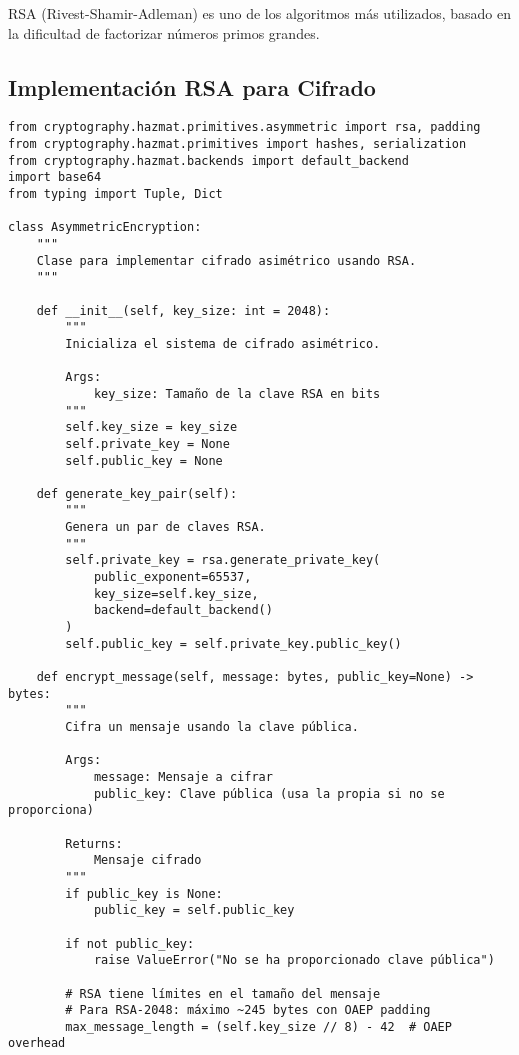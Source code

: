 \documentclass[12pt,a4paper]{article}
\begin{document}
RSA (Rivest-Shamir-Adleman) es uno de los algoritmos más utilizados, basado en la dificultad de factorizar números primos grandes.

\subsection{Implementación RSA para Cifrado}

\begin{lstlisting}[caption=Implementación de cifrado asimétrico con RSA]
from cryptography.hazmat.primitives.asymmetric import rsa, padding
from cryptography.hazmat.primitives import hashes, serialization
from cryptography.hazmat.backends import default_backend
import base64
from typing import Tuple, Dict

class AsymmetricEncryption:
    """
    Clase para implementar cifrado asimétrico usando RSA.
    """
    
    def __init__(self, key_size: int = 2048):
        """
        Inicializa el sistema de cifrado asimétrico.
        
        Args:
            key_size: Tamaño de la clave RSA en bits
        """
        self.key_size = key_size
        self.private_key = None
        self.public_key = None
        
    def generate_key_pair(self):
        """
        Genera un par de claves RSA.
        """
        self.private_key = rsa.generate_private_key(
            public_exponent=65537,
            key_size=self.key_size,
            backend=default_backend()
        )
        self.public_key = self.private_key.public_key()
        
    def encrypt_message(self, message: bytes, public_key=None) -> bytes:
        """
        Cifra un mensaje usando la clave pública.
        
        Args:
            message: Mensaje a cifrar
            public_key: Clave pública (usa la propia si no se proporciona)
            
        Returns:
            Mensaje cifrado
        """
        if public_key is None:
            public_key = self.public_key
            
        if not public_key:
            raise ValueError("No se ha proporcionado clave pública")
            
        # RSA tiene límites en el tamaño del mensaje
        # Para RSA-2048: máximo ~245 bytes con OAEP padding
        max_message_length = (self.key_size // 8) - 42  # OAEP overhead
        

\end{lstlisting}
\end{document}
